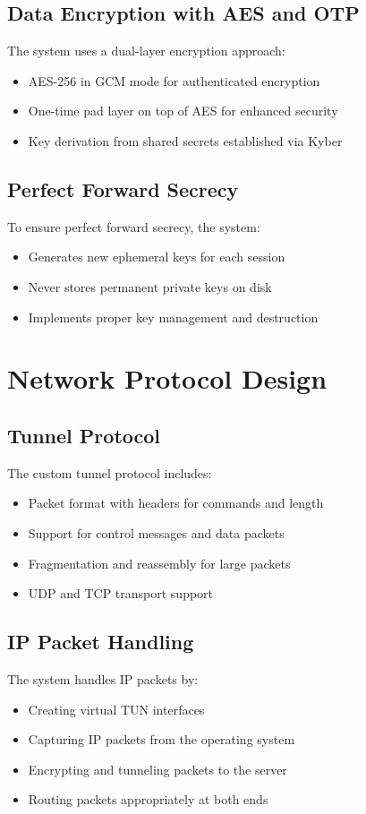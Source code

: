 \documentclass[12pt,a4paper]{report}
\begin{document}
\subsection{Data Encryption with AES and OTP}
The system uses a dual-layer encryption approach:
\begin{itemize}
    \item AES-256 in GCM mode for authenticated encryption
    \item One-time pad layer on top of AES for enhanced security
    \item Key derivation from shared secrets established via Kyber
\end{itemize}

\subsection{Perfect Forward Secrecy}
To ensure perfect forward secrecy, the system:
\begin{itemize}
    \item Generates new ephemeral keys for each session
    \item Never stores permanent private keys on disk
    \item Implements proper key management and destruction
\end{itemize}

\section{Network Protocol Design}
\subsection{Tunnel Protocol}
The custom tunnel protocol includes:
\begin{itemize}
    \item Packet format with headers for commands and length
    \item Support for control messages and data packets
    \item Fragmentation and reassembly for large packets
    \item UDP and TCP transport support
\end{itemize}

\subsection{IP Packet Handling}
The system handles IP packets by:
\begin{itemize}
    \item Creating virtual TUN interfaces
    \item Capturing IP packets from the operating system
    \item Encrypting and tunneling packets to the server
    \item Routing packets appropriately at both ends
\end{itemize}
\end{document}
